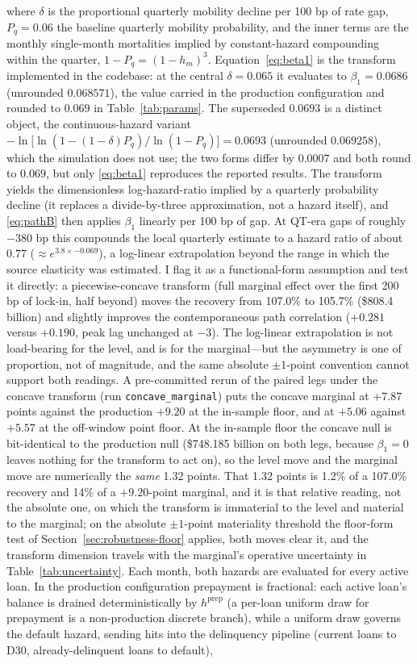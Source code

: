 \documentclass[12pt]{article}
\begin{document}
where $\delta$ is the proportional quarterly mobility decline per 100 bp of rate gap, $P_q = 0.06$ the baseline quarterly mobility probability, and the inner terms are the monthly single-month mortalities implied by constant-hazard compounding within the quarter, $1 - P_q = (1 - h_m)^3$. Equation~\eqref{eq:beta1} is the transform implemented in the codebase: at the central $\delta = 0.065$ it evaluates to $\beta_1 = 0.0686$ (unrounded $0.068571$), the value carried in the production configuration and rounded to $0.069$ in Table~\ref{tab:params}. The superseded $0.0693$ is a distinct object, the continuous-hazard variant $-\ln\!\big[\ln(1-(1-\delta)P_q)/\ln(1-P_q)\big] = 0.0693$ (unrounded $0.069258$), which the simulation does not use; the two forms differ by $0.0007$ and both round to $0.069$, but only \eqref{eq:beta1} reproduces the reported results. The transform yields the dimensionless log-hazard-ratio implied by a quarterly probability decline (it replaces a divide-by-three approximation, not a hazard itself), and \eqref{eq:pathB} then applies $\beta_1$ linearly per 100 bp of gap. At QT-era gaps of roughly $-380$ bp this compounds the local quarterly estimate to a hazard ratio of about $0.77$ ($\approx e^{3.8 \times -0.069}$), a log-linear extrapolation beyond the range in which the source elasticity was estimated. I flag it as a functional-form assumption and test it directly: a piecewise-concave transform (full marginal effect over the first 200 bp of lock-in, half beyond) moves the recovery from 107.0\% to 105.7\% (\$808.4 billion) and slightly improves the contemporaneous path correlation ($+0.281$ versus $+0.190$, peak lag unchanged at $-3$). The log-linear extrapolation is not load-bearing for the level, and is for the marginal---but the asymmetry is one of proportion, not of magnitude, and the same absolute $\pm 1$-point convention cannot support both readings. A pre-committed rerun of the paired legs under the concave transform (run \texttt{concave\_marginal}) puts the concave marginal at $+7.87$ points against the production $+9.20$ at the in-sample floor, and at $+5.06$ against $+5.57$ at the off-window point floor. At the in-sample floor the concave null is bit-identical to the production null (\$748.185 billion on both legs, because $\beta_1 = 0$ leaves nothing for the transform to act on), so the level move and the marginal move are numerically the \emph{same} 1.32 points. That 1.32 points is 1.2\% of a 107.0\% recovery and 14\% of a $+9.20$-point marginal, and it is that relative reading, not the absolute one, on which the transform is immaterial to the level and material to the marginal; on the absolute $\pm 1$-point materiality threshold the floor-form test of Section~\ref{sec:robustness-floor} applies, both moves clear it, and the transform dimension travels with the marginal's operative uncertainty in Table~\ref{tab:uncertainty}. Each month, both hazards are evaluated for every active loan. In the production configuration prepayment is fractional: each active loan's balance is drained deterministically by $h^{\mathrm{prep}}$ (a per-loan uniform draw for prepayment is a non-production discrete branch), while a uniform draw governs the default hazard, sending hits into the delinquency pipeline (current loans to D30, already-delinquent loans to default), 
\end{document}
